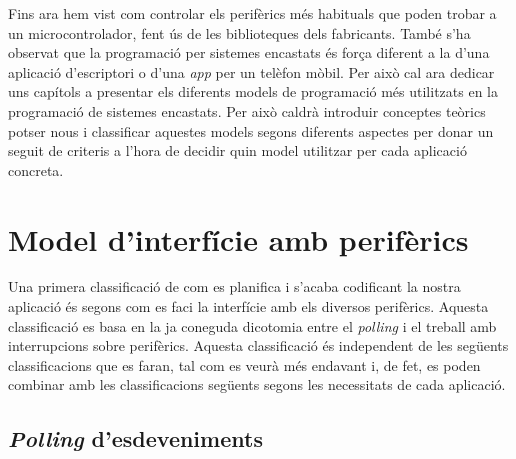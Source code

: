 



Fins ara hem vist com controlar els perifèrics més habituals que poden trobar a un microcontrolador, fent ús de les biblioteques dels fabricants. 
També s'ha observat que la programació per sistemes encastats és força diferent a la d'una aplicació d'escriptori o d'una {\em app} per un telèfon mòbil. Per això cal ara dedicar uns capítols a presentar els diferents models de programació més utilitzats en la programació de sistemes encastats. Per això caldrà introduir conceptes teòrics potser nous i classificar aquestes models segons diferents aspectes per donar un seguit de criteris a l'hora de decidir quin model utilitzar per cada aplicació concreta.

\chapter{Model d'interfície amb perifèrics}
\label{ch:modelinterficie}

Una primera classificació de com es planifica i s'acaba codificant la nostra aplicació és segons com es faci la interfície amb els diversos perifèrics. Aquesta classificació es basa en la ja coneguda dicotomia entre el {\em polling} i el treball amb interrupcions sobre perifèrics. Aquesta classificació és independent de les següents classificacions que es faran, tal com es veurà més endavant i, de fet, es poden combinar amb les classificacions següents segons les necessitats de cada aplicació.

\section{{\em Polling} d'esdeveniments}
\label{sec:polling}

